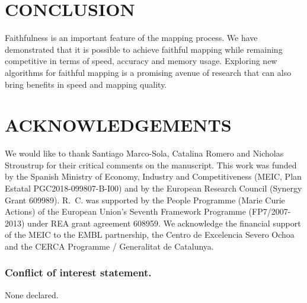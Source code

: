 \documentclass[a4,center,fleqn]{NAR}
\begin{document}
\section{CONCLUSION}

Faithfulness is an important feature of the mapping process. We have
demonstrated that it is possible to achieve faithful mapping while
remaining competitive in terms of speed, accuracy and memory usage.
Exploring new algorithms for faithful mapping is a promising avenue of
research that can also bring benefits in speed and mapping quality.


\section{ACKNOWLEDGEMENTS}

We would like to thank Santiago Marco-Sola, Catalina Romero and Nicholas
Stroustrup for their critical comments on the manuscript.
This work was funded by the Spanish Ministry of Economy, Industry and
Competitiveness (MEIC, Plan Estatal PGC2018-099807-B-I00) and by the
European Research Council (Synergy Grant 609989). R.~C. was supported by
the People Programme (Marie Curie Actions) of the European Union's Seventh
Framework Programme (FP7/2007-2013) under REA grant agreement 608959. We
acknowledge the financial support of the MEIC to the EMBL partnership, the
Centro de Excelencia Severo Ochoa and the CERCA Programme / Generalitat de
Catalunya.




\subsubsection{Conflict of interest statement.} None declared.
\newpage




%
%
%
%
%
\end{document}
